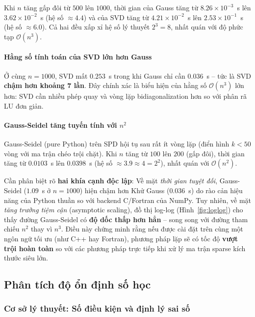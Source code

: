 Khi $n$ tăng gấp đôi từ $500$ lên $1000$, thời gian của Gauss tăng từ $8.26 \times 10^{-3}$~s lên $3.62 \times 10^{-2}$~s (hệ số $\approx 4.4$) và của SVD tăng từ $4.21 \times 10^{-2}$~s lên $2.53 \times 10^{-1}$~s (hệ số $\approx 6.0$). Cả hai đều xấp xỉ hệ số lý thuyết $2^3 = 8$, nhất quán với độ phức tạp $\mathcal{O}(n^3)$.

\paragraph{Hằng số tính toán của SVD lớn hơn Gauss}

Ở cùng $n = 1000$, SVD mất $0.253$~s trong khi Gauss chỉ cần $0.036$~s -- tức là SVD \textbf{chậm hơn khoảng 7 lần}. Đây chính xác là biểu hiện của hằng số $\mathcal{O}(n^3)$ lớn hơn: SVD cần nhiều phép quay và vòng lặp bidiagonalization hơn so với phân rã LU đơn giản.

\paragraph{Gauss-Seidel tăng tuyến tính với $n^2$}

Gauss-Seidel (pure Python) trên SPD hội tụ sau rất ít vòng lặp (điển hình $k < 50$ vòng với ma trận chéo trội chặt). Khi $n$ tăng từ $100$ lên $200$ (gấp đôi), thời gian tăng từ $0.0103$~s lên $0.0398$~s (hệ số $\approx 3.9 \approx 4 = 2^2$), nhất quán với $\mathcal{O}(n^2)$.

Cần phân biệt rõ \textbf{hai khía cạnh độc lập}: Về mặt \textit{thời gian tuyệt đối}, Gauss-Seidel ($1.09$~s ở $n = 1000$) hiện chậm hơn Khử Gauss ($0.036$~s) do rào cản hiệu năng của Python thuần so với backend C/Fortran của NumPy. Tuy nhiên, về mặt \textit{tăng trưởng tiệm cận} (asymptotic scaling), đồ thị log-log (Hình~\ref{fig:loglog}) cho thấy đường Gauss-Seidel có \textbf{độ dốc thấp hơn hẳn} -- song song với đường tham chiếu $n^2$ thay vì $n^3$. Điều này chứng minh rằng nếu được cài đặt trên cùng một ngôn ngữ tối ưu (như C++ hay Fortran), phương pháp lặp sẽ có tốc độ \textbf{vượt trội hoàn toàn} so với các phương pháp trực tiếp khi xử lý ma trận sparse kích thước siêu lớn.

\subsection{Phân tích độ ổn định số học}

\subsubsection{Cơ sở lý thuyết: Số điều kiện và định lý sai số}

